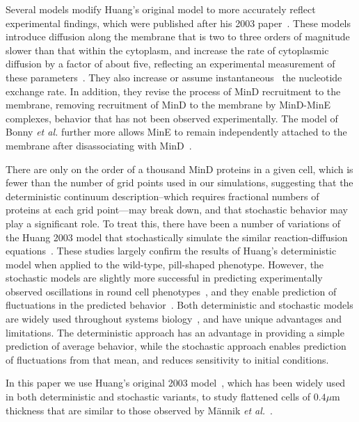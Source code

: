 \documentclass[10pt,letterpaper]{article}
\newcommand\micron{\ensuremath{\mu\text{m}}}
\begin{document}
Several models \cite{fange2006noise, bonny2013membrane,
  halatek2012highly} modify Huang's original model to more accurately
reflect experimental findings, which were published after his 2003
paper~\cite{meacci2006mobility, loose2011min}. These models introduce
diffusion along the membrane that is two to three orders of magnitude
slower than that within the cytoplasm, and increase the rate of
cytoplasmic diffusion by a factor of about five, reflecting an
experimental measurement of these
parameters~\cite{meacci2006mobility}.  They also increase
or assume instantaneous~\cite{bonny2013membrane} the nucleotide
exchange rate.  In addition, they revise the process of MinD
recruitment to the membrane, removing recruitment of MinD to the
membrane by MinD-MinE complexes, behavior that has not been observed
experimentally.  The model of Bonny \emph{et al.} further more allows
MinE to remain independently attached to the membrane after
disassociating with MinD~\cite{bonny2013membrane}.
%

There are only on the order of a thousand MinD proteins in a given
cell, which is fewer than the number of grid points used in our
simulations, suggesting that the deterministic continuum
description--which requires fractional numbers of proteins at each
grid point---may break down, and that stochastic behavior may play a
significant role.  To treat this, there have been a number of
variations of the Huang 2003 model that stochastically simulate the
similar reaction-diffusion equations~\cite{fange2006noise,
  kerr2006division}.  These studies largely confirm the results of
Huang's deterministic model when applied to the wild-type, pill-shaped
phenotype.  However, the stochastic models are slightly more
successful in predicting experimentally observed oscillations in round
cell phenotypes~\cite{fange2006noise, huang2004min}, and they enable
prediction of fluctuations in the predicted
behavior~\cite{kruse2007experimentalist}.  Both deterministic and
stochastic models are widely used throughout systems
biology~\cite{lawson2013spatial, robb2014stochastic,
  oguz2014stochastic, fu2013deterministic, rudiger2014stochastic}, and
have unique advantages and limitations.  The deterministic approach
has an advantage in providing a simple prediction of average behavior,
while the stochastic approach enables prediction of fluctuations from
that mean, and reduces sensitivity to initial conditions.

In this paper we use Huang's original 2003
model~\cite{huang2003dynamic}, which has been widely
used~\cite{hattne2005stochastic,huang2004min,kerr2006division} in both
deterministic and stochastic variants, to study flattened cells of
$0.4\micron$ thickness that are similar to those observed by M\"annik
\emph{et al.}~\cite{mannik2009bacterial}.
\end{document}
